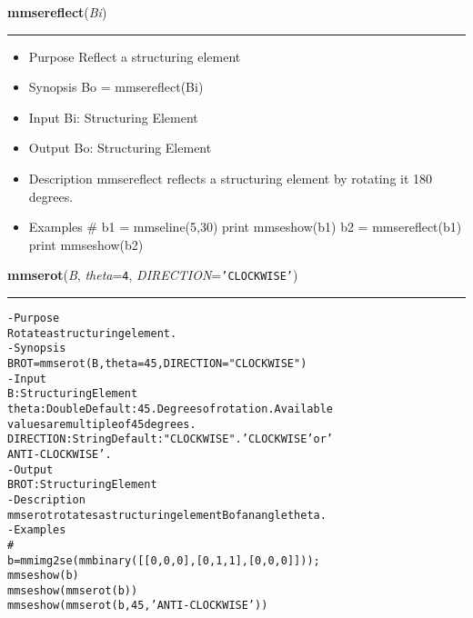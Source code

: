     \begin{boxedminipage}{\textwidth}

    \raggedright \textbf{mmsereflect}(\textit{Bi})

    \vspace{-1.5ex}

    \rule{\textwidth}{0.5\fboxrule}
    \begin{itemize}
    \setlength{\parskip}{0.6ex}
      \item Purpose Reflect a structuring element

      \item Synopsis Bo = mmsereflect(Bi)

      \item Input Bi: Structuring Element

      \item Output Bo: Structuring Element

      \item Description mmsereflect reflects a structuring element by 
        rotating it 180 degrees.

      \item Examples \# b1 = mmseline(5,30) print mmseshow(b1) b2 = 
        mmsereflect(b1) print mmseshow(b2)

    \end{itemize}

    \vspace{1ex}

    \end{boxedminipage}

    \label{multireg:num_pymorph:mmserot}
    \vspace{0.5ex}

    \begin{boxedminipage}{\textwidth}

    \raggedright \textbf{mmserot}(\textit{B}, \textit{theta}=\texttt{4\-}, \textit{DIRECTION}=\texttt{'\-C\-L\-O\-C\-K\-W\-I\-S\-E\-'\-})

    \vspace{-1.5ex}

    \rule{\textwidth}{0.5\fboxrule}
\begin{alltt}
- Purpose
    Rotate a structuring element.
- Synopsis
    BROT = mmserot(B, theta=45, DIRECTION="CLOCKWISE")
- Input
    B:         Structuring Element
    theta:     Double Default: 45. Degrees of rotation. Available
               values are multiple of 45 degrees.
    DIRECTION: String Default: "CLOCKWISE". 'CLOCKWISE' or '
               ANTI-CLOCKWISE'.
- Output
    BROT: Structuring Element
- Description
    mmserot rotates a structuring element B of an angle theta .
- Examples
    \#
    b = mmimg2se(mmbinary([[0, 0, 0], [0, 1, 1], [0, 0, 0]]));
    mmseshow(b)
    mmseshow(mmserot(b))
    mmseshow(mmserot(b,45,'ANTI-CLOCKWISE'))\end{alltt}

    \vspace{1ex}

    \end{boxedminipage}

